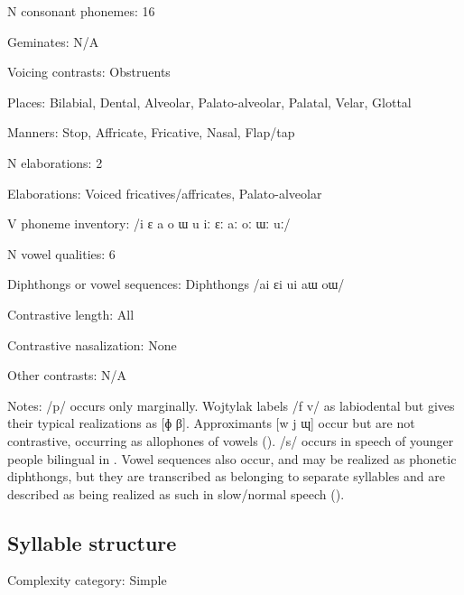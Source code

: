 {\begin{appendixdesc}
\item[N consonant phonemes:] 16

\item[Geminates:] N/A

\item[Voicing contrasts:] Obstruents

\item[Places:] Bilabial, Dental, Alveolar, Palato-alveolar, Palatal, Velar, Glottal

\item[Manners:] Stop, Affricate, Fricative, Nasal, Flap/tap

\item[N elaborations:] 2

\item[Elaborations:] Voiced fricatives/affricates, Palato-alveolar

\item[V phoneme inventory:] /i ɛ a o ɯ u iː ɛː aː oː ɯː uː/

\item[N vowel qualities:] 6

\item[Diphthongs or vowel sequences:] Diphthongs /ai ɛi ui aɯ oɯ/

\item[Contrastive length:] All

\item[Contrastive nasalization:] None

\item[Other contrasts:] N/A

\item[Notes:] /p/ occurs only marginally. Wojtylak labels /f v/ as labiodental but gives their typical realizations as [ɸ β]. Approximants [w j ɰ] occur but are not contrastive, occurring as allophones of vowels (\citeyear[75]{Wojtylak2017}). /s/ occurs in speech of younger people bilingual in . Vowel sequences also occur, and may be realized as phonetic diphthongs, but they are transcribed as belonging to separate syllables and are described as being realized as such in slow/normal speech (\citeyear[90--93]{Wojtylak2017}).
\end{appendixdesc}
\subsection*{Syllable structure}
\begin{appendixdesc}

\item[Complexity category:] Simple


\end{appendixdesc}}
